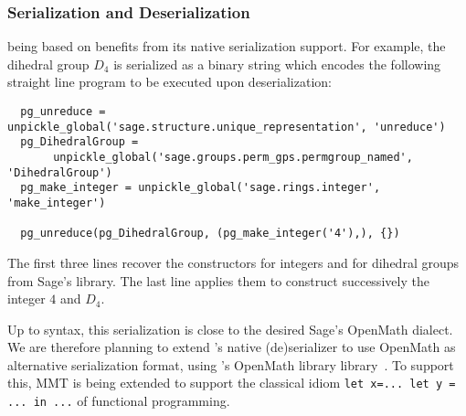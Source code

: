 \subsubsection{Serialization and Deserialization}

\Sage being based on \Python benefits from its native serialization
support. For example, the dihedral group $D_4$ is serialized as a
binary string which encodes the following straight line program to be
executed upon deserialization:
\begin{lstlisting}
  pg_unreduce = unpickle_global('sage.structure.unique_representation', 'unreduce')
  pg_DihedralGroup = 
       unpickle_global('sage.groups.perm_gps.permgroup_named', 'DihedralGroup')
  pg_make_integer = unpickle_global('sage.rings.integer', 'make_integer')

  pg_unreduce(pg_DihedralGroup, (pg_make_integer('4'),), {})
\end{lstlisting}
The first three lines recover the constructors for integers and for
dihedral groups from Sage's library. The last line applies them to
construct successively the integer $4$ and $D_4$.

Up to syntax, this serialization is close to the desired Sage's
OpenMath dialect.
We are therefore planning to extend \Python's native (de)serializer to
use OpenMath as alternative serialization format, using \Python's
OpenMath library library~\cite{py-openmath:on}. To support this, MMT
is being extended to support the classical idiom
\lstinline{let x=... let y = ... in ...}
of functional programming.

